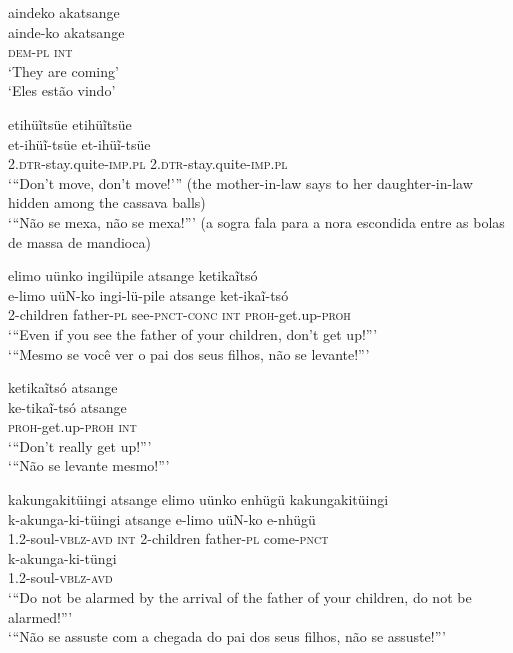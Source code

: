 \documentclass[output=paper,
modfonts,nonflat
]{langsci/langscibook}
\begin{document}
\ea aindeko	akatsange \\[.3em]
\gll ainde-ko 	akatsange \\
\textsc{dem-pl} 	\textsc{int} \\
\glt ‘They are coming’ \\
‘Eles estão vindo’ \\
\z

\ea etihüĩtsüe etihüĩtsüe \\[.3em]
\gll et-ihüĩ-tsüe et-ihüĩ-tsüe \\
2.\textsc{dtr}-stay.quite-\textsc{imp.pl} 2\textsc{.dtr}-stay.quite-\textsc{imp.pl} \\
\glt ‘“Don’t move, don’t move!’” (the mother-in-law says to her daughter-in-law hidden among the cassava balls) \\
‘“Não se mexa, não se mexa!”’ (a sogra fala para a nora escondida entre as bolas de massa de mandioca) \\
\z

\newpage  
\ea elimo uünko ingilüpile atsange ketikaĩtsó \\[.3em]
\gll e-limo		uüN-ko	ingi-lü-pile 		atsange		ket-ikaĩ-tsó \\
2-children 	father-\textsc{pl} 	see\textsc{-pnct-conc} 	\textsc{int} 		\textsc{proh}-get.up-\textsc{proh} \\
\glt ‘“Even if you see the father of your children, don’t get up!”’ \\
‘“Mesmo se você ver o pai dos seus filhos, não se levante!”’ \\
\z

\ea ketikaĩtsó atsange \\[.3em]
\gll ke-tikaĩ-tsó		atsange \\
\textsc{proh}-get.up-\textsc{proh}	\textsc{int} \\
\glt ‘“Don’t really get up!”’ \\
‘“Não se levante mesmo!”’ \\
\z

\ea kakungakitüingi atsange elimo uünko enhügü kakungakitüingi \\[.3em]
\gll k-akunga-ki-tüingi		atsange		e-limo		uüN-ko 	e-nhügü  \\
1.2-soul-\textsc{vblz-avd} 	\textsc{int} 		2-children 	father-\textsc{pl}	come\textsc{-pnct} \\
\gll k-akunga-ki-tüngi \\
1.2-soul-\textsc{vblz-avd} \\
\glt ‘“Do not be alarmed by the arrival of the father of your children, do not be alarmed!”’ \\
‘“Não se assuste com a chegada do pai dos seus filhos, não se assuste!”’ \\
\z
\end{document}
